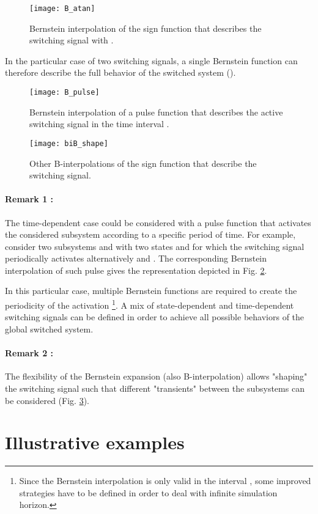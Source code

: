 \documentclass[12pt]{article}
\begin{document}
 
\begin{figure}[!h]
\centering
\texttt{[image: B\_atan]}
\caption{Bernstein interpolation of the sign function that describes the switching signal  with .}
\label{fig:B_atan}
\end{figure}
In the particular case of two switching signals, a single Bernstein function can therefore describe the full behavior of the switched system (). 
\begin{figure}[!h]
\centering
\texttt{[image: B\_pulse]}
\caption{Bernstein interpolation of a pulse function that describes the active switching signal  in the time interval .}
\label{fig:B_pulse}
\end{figure}
\begin{figure}[!h]
\centering
\texttt{[image: biB\_shape]}
\caption{Other B-interpolations of the sign function that describe the switching signal.}
\label{fig:biB_shape}
\end{figure}


\paragraph{Remark 1 :} 
The time-dependent case could be considered with a pulse function that activates the considered subsystem according to a specific period of time. For example, consider two subsystems 
  and  with two states  and  for which the switching signal periodically activates alternatively  and . The corresponding Bernstein interpolation 
 of such pulse gives the representation depicted in Fig. \ref{fig:B_pulse}.
 
\noindent
In this particular case, multiple Bernstein functions are required to create the periodicity of the activation \footnote{Since the Bernstein interpolation is only valid in 
the interval , some improved strategies have to be defined in order to deal with infinite simulation horizon.}. A mix of state-dependent and time-dependent switching 
signals can be defined in order to achieve all possible behaviors of the global switched system.
\paragraph{Remark 2 :} The flexibility of the Bernstein expansion (also B-interpolation) allows "shaping" the switching signal such that different "transients" between the subsystems 
can be considered (Fig. \ref{fig:biB_shape}).

\section{Illustrative examples}
\end{document}

